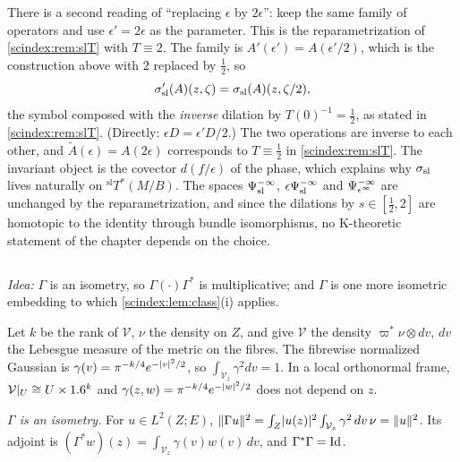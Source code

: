 There is a second reading of ``replacing $\epsilon$ by $2\epsilon$'': keep the
same family of operators and use $\epsilon'=2\epsilon$ as the parameter. This is
the reparametrization of \cref{scindex:rem:slT} with $T\equiv2$. The family is
$A'(\epsilon')=A(\epsilon'/2)$, which is the construction above with $2$ replaced
by $\frac12$, so
\begin{equation*}
  \sigma_{\mathrm{sl}}'(A)(z,\zeta)=\sigma_{\mathrm{sl}}(A)(z,\zeta/2),
\end{equation*}
the symbol composed with the \emph{inverse} dilation by $T(0)^{-1}=\frac12$, as
stated in \cref{scindex:rem:slT}. (Directly: $\epsilon D=\epsilon'D/2$.) The two
operations are inverse to each other, and $\tilde A(\epsilon)=A(2\epsilon)$
corresponds to $T\equiv\frac12$ in \cref{scindex:rem:slT}. The invariant object is
the covector $d(f/\epsilon)$ of the phase, which explains why $\sigma_{\mathrm{sl}}$ lives
naturally on ${}^{\mathrm{sl}}T^*(M/B)$. The spaces $\Psi^{-\infty}_{\mathrm{sl}}$,
$\epsilon\Psi^{-\infty}_{\mathrm{sl}}$ and $\Psi^{-\infty}_{\epsilon^\infty}$ are unchanged by the reparametrization,
and since the dilations by $s\in[\frac12,2]$ are homotopic to the identity through
bundle isomorphisms, no K-theoretic statement of the chapter depends on the
choice.

\subsection*{}

\emph{Idea:} $\Gamma$ is an isometry, so $\Gamma(\cdot)\Gamma^*$ is multiplicative;
and $\Gamma$ is one more isometric embedding to which \cref{scindex:lem:class}(i)
applies.

Let $k$ be the rank of $\mathcal V$, $\nu$ the density on $Z$, and give $\mathcal V$
the density $\varpi^*\nu\otimes dv$, $dv$ the Lebesgue measure of the metric on the
fibres. The fibrewise normalized Gaussian is $\gamma(v)=\pi^{-k/4}e^{-\lvert v\rvert^2/2}$,
so $\int_{\mathcal V_z}\gamma^2dv=1$. In a local orthonormal frame,
$\mathcal V|_U\cong U\times1.6^k$ and $\gamma(z,w)=\pi^{-k/4}e^{-\lvert w\rvert^2/2}$ does
not depend on $z$.

\emph{$\Gamma$ is an isometry.} For $u\in L^2(Z;E)$,
$\lVert \Gamma u\rVert^2=\int_Z\lvert u(z)\rvert^2\int_{\mathcal V_z}\gamma^2\,dv\,\nu=\lVert u\rVert^2$.
Its adjoint is $(\Gamma^*w)(z)=\int_{\mathcal V_z}\gamma(v)w(v)\,dv$, and
$\Gamma^*\Gamma=\operatorname{Id}$.

